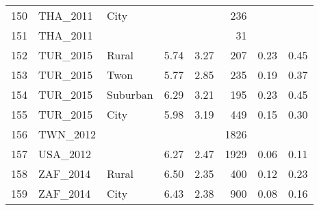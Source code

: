 \documentclass[12pt, titlepage]{article}
\begin{document}
\begin{table}[ht]
\begin{tabular}{rllrrrrr}
		150 & THA\_2011 & City &  &  & 236 &  &  \\ 
		151 & THA\_2011 &  &  &  &  31 &  &  \\ 
		152 & TUR\_2015 & Rural & 5.74 & 3.27 & 207 & 0.23 & 0.45 \\ 
		153 & TUR\_2015 & Twon & 5.77 & 2.85 & 235 & 0.19 & 0.37 \\ 
		154 & TUR\_2015 & Suburban & 6.29 & 3.21 & 195 & 0.23 & 0.45 \\ 
		155 & TUR\_2015 & City & 5.98 & 3.19 & 449 & 0.15 & 0.30 \\ 
		156 & TWN\_2012 &  &  &  & 1826 &  &  \\ 
		157 & USA\_2012 &  & 6.27 & 2.47 & 1929 & 0.06 & 0.11 \\ 
		158 & ZAF\_2014 & Rural & 6.50 & 2.35 & 400 & 0.12 & 0.23 \\ 
		159 & ZAF\_2014 & City & 6.43 & 2.38 & 900 & 0.08 & 0.16 \\ 
		\hline
	\end{tabular}
\end{table}
\end{document}
